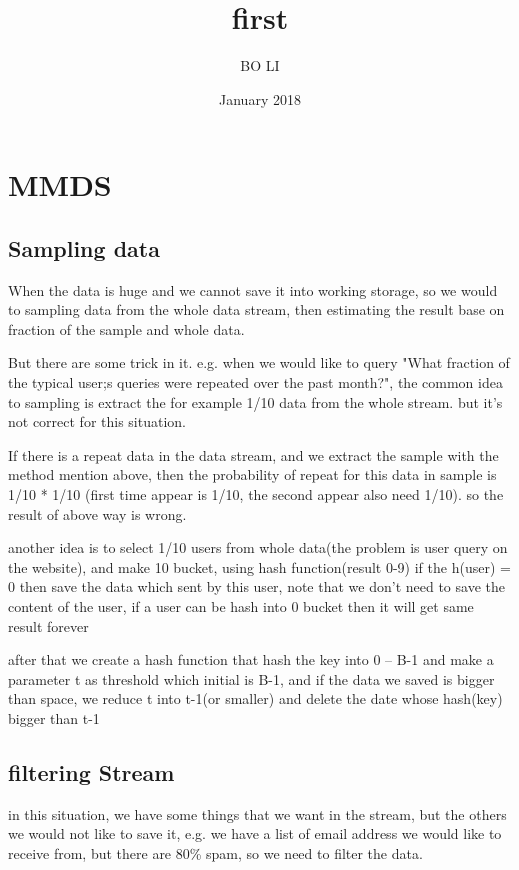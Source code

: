 \documentclass{article}
\title{first}
\author{BO LI }
\date{January 2018}
\begin{document}
\maketitle

\section{MMDS}

\subsection{Sampling data}
When the data is huge and we cannot save it into working storage, so we would to sampling data from the whole data stream, then estimating the result base on fraction of the sample and whole data.

But there are some trick in it. e.g. when we would like to query "What fraction of the typical user;s queries were repeated over the past month?", the common idea to sampling is extract the for example 1/10 data from the whole stream. but it's not correct for this situation.

If there is a repeat data in the data stream, and we extract the sample with the method mention above, then the probability of repeat for this data in sample is 1/10 * 1/10 (first time appear is 1/10, the second appear also need 1/10). so the result of above way is wrong.

another idea is to select 1/10 users from whole data(the problem is user query on the website), and make 10 bucket, using hash function(result 0-9) if the h(user) = 0 then save the data which sent by this user, note that we don't need to save the content of the user, if a user can be hash into 0 bucket then it will get same result forever

after that we create a hash function that hash the key into 0 -- B-1 and make a parameter t as threshold which initial is B-1, and if the data we saved is bigger than space, we reduce t into t-1(or smaller) and  delete the date whose hash(key) bigger than t-1 

\subsection{filtering Stream}
in this situation, we have some things that we want in the stream, but the others we would not like to save it, e.g. we have a list of email address we would like to receive from, but there are 80\% spam, so we need to filter the data.
\end{document}
